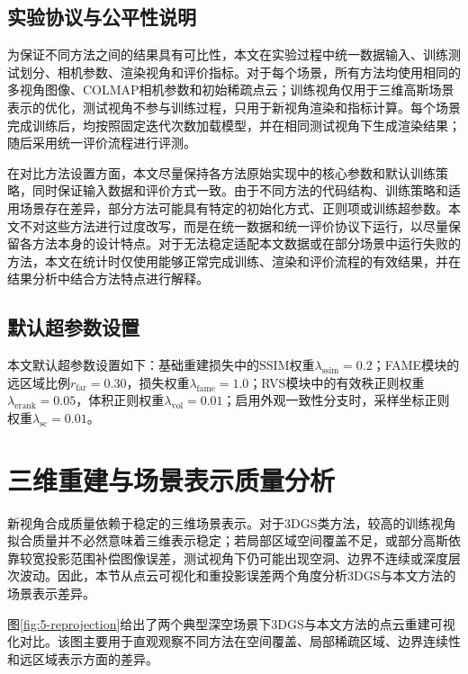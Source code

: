 \subsection{实验协议与公平性说明}
为保证不同方法之间的结果具有可比性，本文在实验过程中统一数据输入、训练测试划分、相机参数、渲染视角和评价指标。对于每个场景，所有方法均使用相同的多视角图像、COLMAP相机参数和初始稀疏点云；训练视角仅用于三维高斯场景表示的优化，测试视角不参与训练过程，只用于新视角渲染和指标计算。每个场景完成训练后，均按照固定迭代次数加载模型，并在相同测试视角下生成渲染结果；随后采用统一评价流程进行评测。

在对比方法设置方面，本文尽量保持各方法原始实现中的核心参数和默认训练策略，同时保证输入数据和评价方式一致。由于不同方法的代码结构、训练策略和适用场景存在差异，部分方法可能具有特定的初始化方式、正则项或训练超参数。本文不对这些方法进行过度改写，而是在统一数据和统一评价协议下运行，以尽量保留各方法本身的设计特点。对于无法稳定适配本文数据或在部分场景中运行失败的方法，本文在统计时仅使用能够正常完成训练、渲染和评价流程的有效结果，并在结果分析中结合方法特点进行解释。

\subsection{默认超参数设置}
本文默认超参数设置如下：基础重建损失中的$\mathrm{SSIM}$权重$\lambda_{\mathrm{ssim}}=0.2$；FAME模块的远区域比例$r_{\mathrm{far}}=0.30$，损失权重$\lambda_{\mathrm{fame}}=1.0$；RVS模块中的有效秩正则权重$\lambda_{\mathrm{erank}}=0.05$，体积正则权重$\lambda_{\mathrm{vol}}=0.01$；启用外观一致性分支时，采样坐标正则权重$\lambda_{\mathrm{sc}}=0.01$。



\section{三维重建与场景表示质量分析}
新视角合成质量依赖于稳定的三维场景表示。对于3DGS类方法，较高的训练视角拟合质量并不必然意味着三维表示稳定；若局部区域空间覆盖不足，或部分高斯依靠较宽投影范围补偿图像误差，测试视角下仍可能出现空洞、边界不连续或深度层次波动。因此，本节从点云可视化和重投影误差两个角度分析3DGS与本文方法的场景表示差异。

图\ref{fig:5-reprojection}给出了两个典型深空场景下3DGS与本文方法的点云重建可视化对比。该图主要用于直观观察不同方法在空间覆盖、局部稀疏区域、边界连续性和远区域表示方面的差异。

